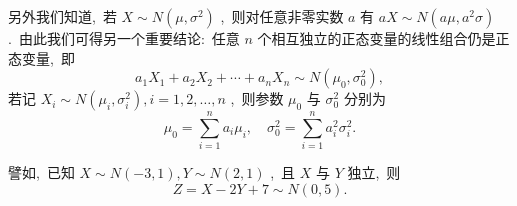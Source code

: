    另外我们知道,\ 若 $X\sim N(\mu,\sigma^2)$ ,\ 则对任意非零实数 $a$ 有 $aX\sim N(a\mu,a^2\sigma)$ .\ 由此我们可得另一个重要结论:\ 任意 $n$ 个相互独立的正态变量的线性组合仍是正态变量,\ 即
   \begin{equation}\label{eq:3.3.15}
   	a_1X_1+a_2X_2+\cdots+a_nX_n\sim N(\mu_0,\sigma_0^2),
   \end{equation}
   若记 $X_i\sim N(\mu_i,\sigma_i^2),i=1,2,\ldots,n$ ,\ 则参数 $\mu_0$ 与 $\sigma_0^2$ 分别为
   \begin{equation*}
   	\mu_0=\sum_{i=1}^{n}a_i\mu_i,\quad \sigma_0^2=\sum_{i=1}^{n}a_i^2\sigma_i^2.
   \end{equation*}
   
   譬如,\ 已知 $X\sim N(-3,1),Y\sim N(2,1)$ ,\ 且 $X$ 与 $Y$ 独立,\ 则
   \begin{equation*}
   	Z=X-2Y+7\sim N(0,5).
   \end{equation*}
